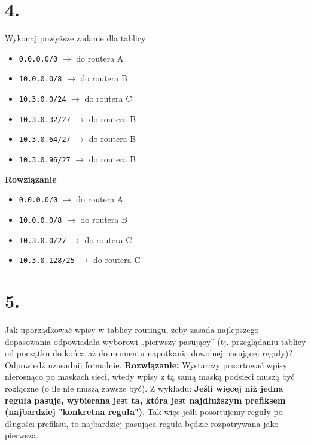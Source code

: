 \documentclass{article}
\begin{document}
\section*{4.}
Wykonaj powyższe zadanie dla tablicy
\begin{itemize}
    \item \texttt{0.0.0.0/0} $\rightarrow$ do routera A
    \item \texttt{10.0.0.0/8} $\rightarrow$ do routera B
    \item \texttt{10.3.0.0/24} $\rightarrow$ do routera C
    \item \texttt{10.3.0.32/27} $\rightarrow$ do routera B
    \item \texttt{10.3.0.64/27} $\rightarrow$ do routera B
    \item \texttt{10.3.0.96/27} $\rightarrow$ do routera B
\end{itemize}
\textbf{Rowziązanie}
\begin{itemize}
    \item \texttt{0.0.0.0/0} $\rightarrow$ do routera A
    \item \texttt{10.0.0.0/8} $\rightarrow$ do routera B
    \item \texttt{10.3.0.0/27} $\rightarrow$ do routera C
    \item \texttt{10.3.0.128/25} $\rightarrow$ do routera C
\end{itemize}

\section*{5.}
Jak uporządkować wpisy w tablicy routingu, żeby zasada najlepszego dopasowania odpowiadała wyborowi „pierwszy pasujący” (tj. przeglądaniu tablicy od początku do końca aż do momentu napotkania dowolnej pasującej reguły)? Odpowiedź uzasadnij formalnie.
\newline \textbf{Rozwiązanie:} \newline
Wystarczy posortować wpisy nierosnąco po maskach sieci, wtedy wpisy z tą samą maską podsieci muszą być rozłączne (o ile nie muszą zawsze być). Z wykładu: \textbf{Jeśli więcej niż jedna reguła pasuje, wybierana jest ta, która jest najdłuższym prefiksem (najbardziej "konkretna reguła")}. Tak więc jeśli posortujemy reguły po długości prefiksu, to najbardziej pasująca reguła będzie rozpatrywana jako pierwsza.
\end{document}
